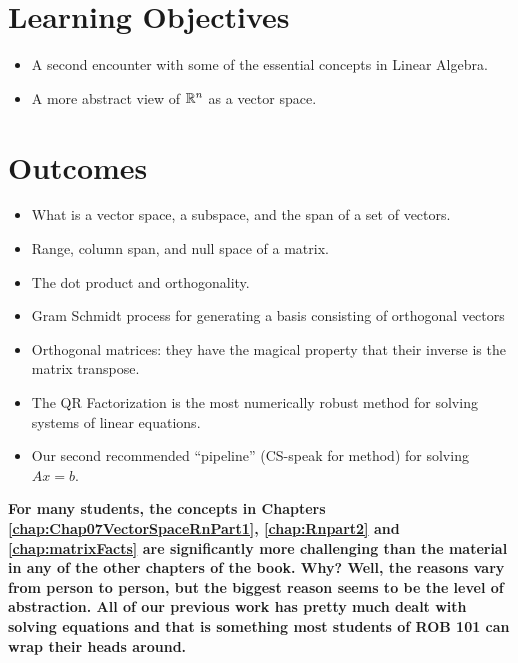 \section*{Learning Objectives}
\begin{itemize}
\item A second encounter with some of the essential concepts in Linear Algebra.
\item A more abstract view of $\mathbb R^n$ as a vector space.
\end{itemize}

\section*{Outcomes}
\begin{itemize}
\item What is a vector space, a subspace, and the span of a set of vectors.
\item Range, column span, and null space of a matrix.
\item The dot product and orthogonality.
\item Gram Schmidt process for generating a basis consisting of orthogonal vectors
\item Orthogonal matrices: they have the magical property that their inverse is the matrix transpose.
\item The QR Factorization is the most numerically robust method for solving systems of linear equations. 
\item Our second recommended ``pipeline'' (CS-speak for method) for solving $Ax=b$.
\end{itemize}

\vspace*{2cm}

\begin{tcolorbox}[sharp corners, colback=yellow!30, colframe=yellow!80!red, title=\textcolor{red}{\Large \bf Reminder: Additional Study Time May Be Required}] 
\bf For many students, the concepts in Chapters \ref{chap:Chap07VectorSpaceRnPart1}, \ref{chap:Rnpart2} and \ref{chap:matrixFacts} are significantly more challenging than the material in any of the other chapters of the book. Why? Well, the reasons vary from person to person, but the biggest reason seems to be the level of abstraction. All of our previous work has pretty much dealt with solving equations and that is something most students of ROB 101 can wrap their heads around.
\end{tcolorbox}


\newpage
